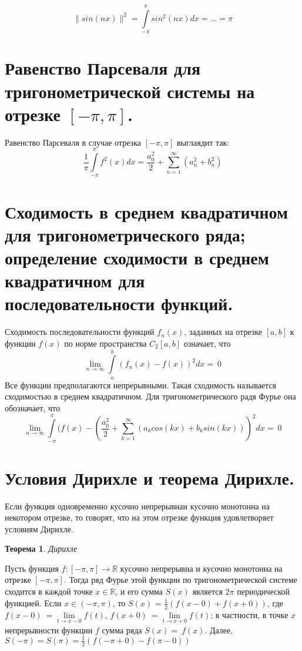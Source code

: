 \documentclass[12pt, a4paper]{article}
\newtheorem{thm}{Теорема}
\begin{document}
$$
    \| sin(nx) \|^2 = \int\limits_{-\pi}^{\pi}sin^2(nx)dx = \ldots = 
    \pi
$$

\section{Равенство Парсеваля для тригонометрической системы на отрезке $[-\pi, \pi]$.}
Равенство Парсеваля в случае отрезка $[-\pi, \pi]$ выглаядит так:
$$
\frac{1}{\pi} \int\limits_{-\pi}^{\pi} f^2(x)dx = \frac{a^2_0}{2} + 
\sum\limits_{n=1}^{\infty}(a^2_n + b^2_n) 
$$

\section{Сходимость в среднем квадратичном для тригонометрического ряда; определение сходимости в среднем квадратичном для последовательности функций.}
Сходимость последовательности функций $f_n(x)$, заданных на отрезке
$[a, b]$ к функции $f(x)$ по норме пространства $C_2[a, b]$ означает,
что 
$$\lim\limits_{n \to \infty}\int\limits_a^b(f_n(x) - f(x))^2dx = \ 0$$
Все функции предполагаются непрерывными. Такая сходимость называется
сходимостью в среднем квадратичном.
\newline
Для тригонометрического радя Фурье она обозначает, что
$$\lim\limits_{n \to \infty}\int\limits_{-\pi}^{\pi}(f(x) - (\frac{a^2_0}{2} + 
\sum\limits_{k=1}^{\infty}(a_k cos(kx) + b_k sin(kx)) )^2dx = \ 0$$

\section{Условия Дирихле и теорема Дирихле.}
Если функция одновременно кусочно непрерывнаи кусочно монотонна на 
некотором отрезке, то говорят, что на этом отрезке функция удовлетворяет условиям
Дирихле.
\begin{thm}
    Дирихле
\end{thm}
Пусть функция $f: [-\pi, \pi] \to \mathbb{R}$ кусочно непрерывна и кусочно
монотонна на отрезке $[-\pi, \pi]$. Тогда ряд Фурье этой функции по
тригонометрической системе сходится в каждой точке $x \in \mathbb{R}$, и его
сумма $S(x)$ является $2\pi$ периодической функцией.
\newline
Если $x \in (-\pi, \pi)$, то $S(x)$ = $\frac{1}{2}(f(x - 0) + f(x + 0))$,
где $f(x - 0) \ = \lim\limits_{t \to x - 0}f(t)$,
$f(x + 0) \ = \lim\limits_{t \to x + 0}f(t)$; в частности, в точке $x$
непрерывности функции $f$ сумма ряда $S(x) = \ f(x)$. Далее,
$S(-\pi) = S(\pi) = \frac{1}{2}(f(-\pi + 0) - f(\pi - 0))$
\end{document}
